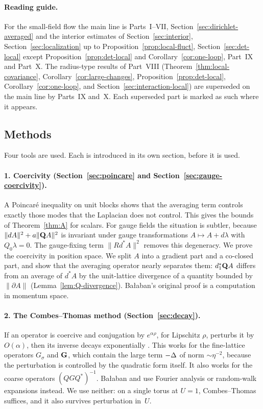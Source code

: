 \paragraph{Reading guide.} For the small-field flow the main line is Parts~I--VII, Section~\ref{sec:dirichlet-averaged} and the interior estimates of Section~\ref{sec:interior}, Section~\ref{sec:localization} up to Proposition~\ref{prop:local-fluct}, Section~\ref{sec:det-local} except Proposition~\ref{prop:det-local} and Corollary~\ref{cor:one-loop}, Part~IX and Part~X. The radius-type results of Part~VIII (Theorem~\ref{thm:local-covariance}, Corollary~\ref{cor:large-changes}, Proposition~\ref{prop:det-local}, Corollary~\ref{cor:one-loop}, and Section~\ref{sec:interaction-local}) are superseded on the main line by Parts~IX and~X. Each superseded part is marked as such where it appears.

\subsection{Methods}

Four tools are used. Each is introduced in its own section, before it is used.

\paragraph{1. Coercivity (Section~\ref{sec:poincare} and Section~\ref{sec:gauge-coercivity}).} A Poincar\'e inequality on unit blocks shows that the averaging term controls exactly those modes that the Laplacian does not control. This gives the bounds of Theorem~\ref{thm:A} for scalars. For gauge fields the situation is subtler, because $\|dA\|^2+a\|\mathbf Q A\|^2$ is invariant under gauge transformations $A\mapsto A+d\lambda$ with $Q_0\lambda=0$. The gauge-fixing term $\|Rd^*A\|^2$ removes this degeneracy. We prove the coercivity in position space. We split $A$ into a gradient part and a co-closed part, and show that the averaging operator nearly separates them: $d_1^*\mathbf Q A$ differs from an average of $d^*A$ by the unit-lattice divergence of a quantity bounded by $\|\partial A\|$ (Lemma~\ref{lem:Q-divergence}). Ba\l aban's original proof \cite{BalPropI} is a computation in momentum space.

\paragraph{2. The Combes--Thomas method (Section~\ref{sec:decay}).} If an operator is coercive and conjugation by $e^{\alpha\rho}$, for Lipschitz $\rho$, perturbs it by $O(\alpha)$, then its inverse decays exponentially \cite{CT}. This works for the fine-lattice operators $G_\sigma$ and $\mathbf G$, which contain the large term $-\Delta$ of norm $\sim\eta^{-2}$, because the perturbation is controlled by the quadratic form itself. It also works for the coarse operators $(QGQ^*)^{-1}$. Ba\l aban and \cite{DST1} use Fourier analysis or random-walk expansions instead. We use neither: on a single torus at $U=1$, Combes--Thomas suffices, and it also survives perturbation in~$U$.

